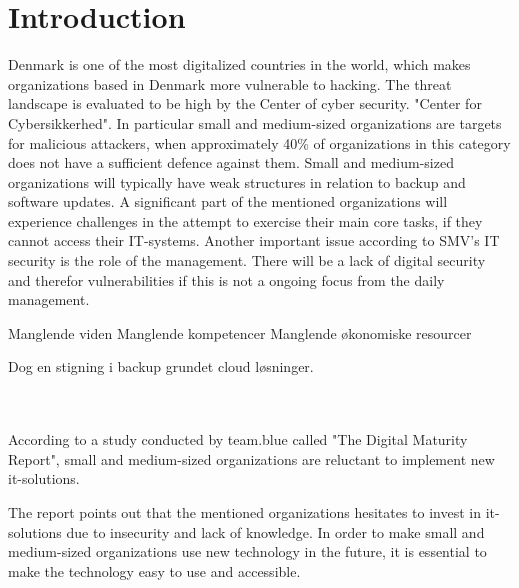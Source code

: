 \documentclass[12pt,a4paper]{article}
\begin{document}

\clearpage
\tableofcontents
\clearpage

\section{Introduction}
\label{introduktion}
Denmark is one of the most digitalized countries in the world, which makes organizations based in Denmark more vulnerable to hacking.\cite{Digital_SMV_2024} The threat landscape is evaluated to be high by the Center of cyber security. "Center for Cybersikkerhed".\cite{Digital_SMV_2024}
In particular small and medium-sized organizations are targets for malicious attackers, when approximately 40\% of organizations in this category does not have a sufficient defence against them.\cite{Digital_SMV_2024} Small and medium-sized organizations will typically have weak structures in relation to backup and software updates.\cite{Digital_SMV_2024} A significant part of the mentioned organizations will experience challenges in the attempt to exercise their main core tasks, if they cannot access their IT-systems.
Another important issue according to SMV's IT security is the role of the management. There will be a lack of digital security and  therefor vulnerabilities if this is not a ongoing focus from the daily management. 

Manglende viden
Manglende kompetencer
Manglende økonomiske resourcer

Dog en stigning i backup grundet cloud løsninger.


\cite{Digital_SMV_2024}\\ \\

According to a study conducted by team.blue called "The Digital Maturity Report", small and medium-sized organizations are reluctant to implement new it-solutions.\cite{smvdanmark} 

The report points out that the mentioned organizations hesitates to invest in it-solutions due to insecurity and lack of knowledge.\cite{smvdanmark} In order to make small and medium-sized organizations use new technology in the future, it is essential to make the technology easy to use and accessible.\cite{smvdanmark} \\ \\ 

\end{document}

